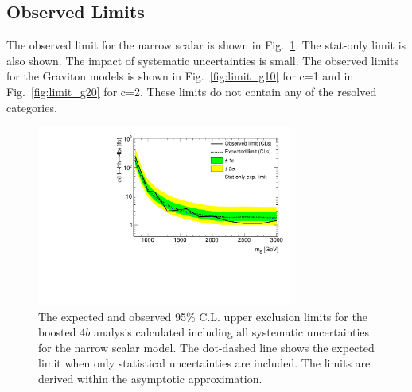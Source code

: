 \subsection{Observed Limits}
\label{sec:observedlimits}

The observed limit for the narrow scalar is shown in Fig.~\ref{fig:limit_scalar}. The stat-only limit is also shown. The impact of systematic uncertainties is small. The observed limits for the Graviton models is shown in Fig.~\ref{fig:limit_g10} for c=1 and in Fig.~\ref{fig:limit_g20} for c=2. These limits do not contain any of the resolved categories.

\begin{figure}
\begin{center}
\includegraphics[width=0.75\textwidth,angle=-90]{figures/boosted/results/limit_boosted_boosted_okt18_s.pdf}
\caption{The expected and observed 95\% C.L. upper exclusion limits for the boosted $4b$ analysis calculated including all systematic uncertainties for the narrow scalar model. The dot-dashed line shows the expected limit when only statistical uncertainties are included. The limits are derived within the asymptotic approximation.}
\label{fig:limit_scalar}
\end{center}
\end{figure}


